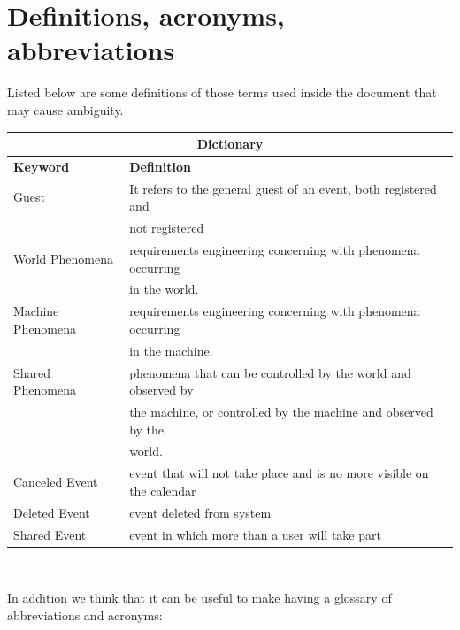 \documentclass[12pt]{book}
\begin{document}
\section{Definitions, acronyms, abbreviations}
Listed below are some definitions of those terms used inside the document that may cause ambiguity. \\ \medskip

\begin{tabular}{ |l|l| }
  \hline
  \hline
  \multicolumn{2}{|c|}{\large{\textbf{Dictionary}}} \\
  \hline
  \hline
  \textbf{Keyword} & \textbf{Definition} \\
  \hline
  Guest & It refers to the general guest of an event, both registered and\\& not registered\\
  World Phenomena & requirements engineering concerning with phenomena occurring \\&in the world.\\
  Machine Phenomena & requirements engineering concerning with phenomena occurring\\& in the machine.\\
  Shared Phenomena & phenomena that can be controlled by the world and observed by \\&the machine, or controlled by the machine and observed by the\\& world. \\
 Canceled Event & event that will not take place and is no more visible on the calendar \\
 Deleted Event & event deleted from system\\  
 Shared Event & event in which more than a user will take part \\
  \hline
  \hline
\end{tabular} \\ 
\vspace{0.5cm}

In addition we think that it can be useful to make having a glossary of abbreviations and acronyms:  \\ \medskip
\end{document}
